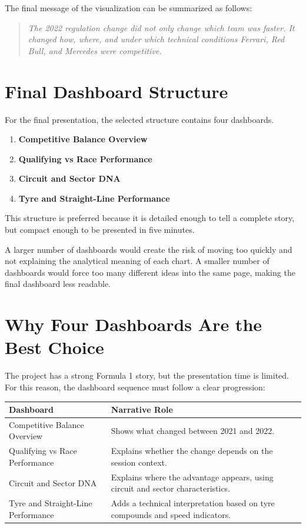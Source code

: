 \documentclass[12pt,a4paper]{article}
\begin{document}
	The final message of the visualization can be summarized as follows:
	
	\begin{quote}
		\textit{The 2022 regulation change did not only change which team was faster. It changed how, where, and under which technical conditions Ferrari, Red Bull, and Mercedes were competitive.}
	\end{quote}
	
	\section{Final Dashboard Structure}
	
	For the final presentation, the selected structure contains four dashboards.
	
	\begin{enumerate}[leftmargin=1.2cm]
		\item \textbf{Competitive Balance Overview}
		\item \textbf{Qualifying vs Race Performance}
		\item \textbf{Circuit and Sector DNA}
		\item \textbf{Tyre and Straight-Line Performance}
	\end{enumerate}
	
	This structure is preferred because it is detailed enough to tell a complete story, but compact enough to be presented in five minutes.
	
	A larger number of dashboards would create the risk of moving too quickly and not explaining the analytical meaning of each chart.
	A smaller number of dashboards would force too many different ideas into the same page, making the final dashboard less readable.
	
	\section{Why Four Dashboards Are the Best Choice}
	
	The project has a strong Formula 1 story, but the presentation time is limited.
	For this reason, the dashboard sequence must follow a clear progression:
	
	\begin{center}
		\begin{tabularx}{\textwidth}{p{4cm} X}
			\toprule
			\textbf{Dashboard} & \textbf{Narrative Role} \\
			\midrule
			Competitive Balance Overview & Shows what changed between 2021 and 2022. \\
			Qualifying vs Race Performance & Explains whether the change depends on the session context. \\
			Circuit and Sector DNA & Explains where the advantage appears, using circuit and sector characteristics. \\
			Tyre and Straight-Line Performance & Adds a technical interpretation based on tyre compounds and speed indicators. \\
			\bottomrule
		\end{tabularx}
	\end{center}
	
\end{document}
